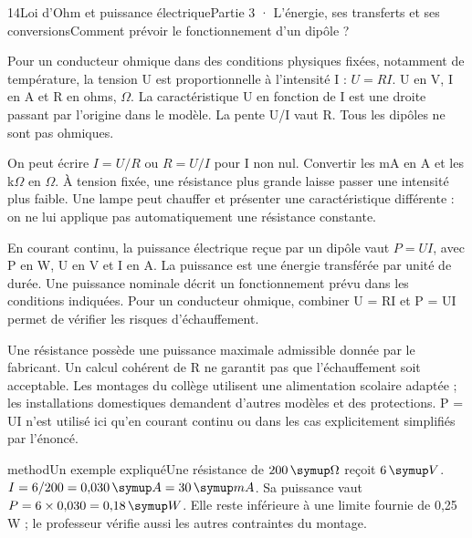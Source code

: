 \begin{ouverture}[college3]{14}{Loi d’Ohm et puissance électrique}{Partie 3 · L’énergie, ses transferts et ses conversions}{Comment prévoir le fonctionnement d’un dipôle ?}
\end{ouverture}
\label{ess-14}
Pour un conducteur ohmique dans des conditions physiques fixées, notamment de température, la tension U est proportionnelle à l’intensité I : $U=RI$. U en V, I en A et R en ohms, $\Omega$. La caractéristique U en fonction de I est une droite passant par l’origine dans le modèle. La pente U/I vaut R. Tous les dipôles ne sont pas ohmiques.\par
{}
On peut écrire $I=U/R$ ou $R=U/I$ pour I non nul. Convertir les mA en A et les k$\Omega$ en $\Omega$. À tension fixée, une résistance plus grande laisse passer une intensité plus faible. Une lampe peut chauffer et présenter une caractéristique différente : on ne lui applique pas automatiquement une résistance constante.\par
\clearpage
{}
En courant continu, la puissance électrique reçue par un dipôle vaut $P=UI$, avec P en W, U en V et I en A. La puissance est une énergie transférée par unité de durée. Une puissance nominale décrit un fonctionnement prévu dans les conditions indiquées. Pour un conducteur ohmique, combiner U = RI et P = UI permet de vérifier les risques d’échauffement.\par
{}
Une résistance possède une puissance maximale admissible donnée par le fabricant. Un calcul cohérent de R ne garantit pas que l’échauffement soit acceptable. Les montages du collège utilisent une alimentation scolaire adaptée ; les installations domestiques demandent d’autres modèles et des protections. P = UI n’est utilisé ici qu’en courant continu ou dans les cas explicitement simplifiés par l’énoncé.\par
\begin{pcEncadre}{method}{Un exemple expliqué}Une résistance de $200\unite\Omega$ reçoit $6\unite V$. $I=6/200=0{,}030\unite A=30\unite{mA}$. Sa puissance vaut $P=6\times0{,}030=0{,}18\unite W$. Elle reste inférieure à une limite fournie de 0,25 W ; le professeur vérifie aussi les autres contraintes du montage.\end{pcEncadre}
